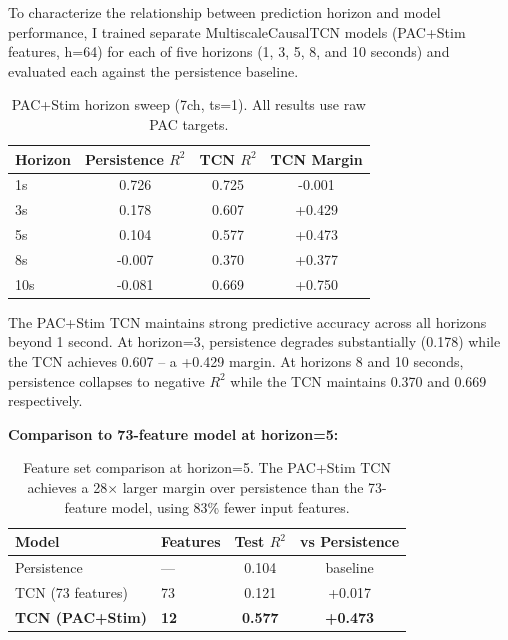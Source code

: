 \documentclass[11pt,letterpaper]{article}
\begin{document}
To characterize the relationship between prediction horizon and model performance, I trained separate MultiscaleCausalTCN models (PAC+Stim features, h=64) for each of five horizons (1, 3, 5, 8, and 10 seconds) and evaluated each against the persistence baseline.

\begin{table}[htbp]
\centering
\caption{PAC+Stim horizon sweep (7ch, ts=1). All results use raw PAC targets.}
\label{tab:horizon_sweep}
\small
\begin{tabular}{lccc}
\toprule
\textbf{Horizon} & \textbf{Persistence $R^2$} & \textbf{TCN $R^2$} & \textbf{TCN Margin} \\
\midrule
1s & 0.726 & 0.725 & -0.001 \\
3s & 0.178 & 0.607 & +0.429 \\
5s & 0.104 & 0.577 & +0.473 \\
8s & -0.007 & 0.370 & +0.377 \\
10s & -0.081 & 0.669 & +0.750 \\
\bottomrule
\end{tabular}
\end{table}

The PAC+Stim TCN maintains strong predictive accuracy across all horizons beyond 1 second. At horizon=3, persistence degrades substantially (0.178) while the TCN achieves 0.607 -- a +0.429 margin. At horizons 8 and 10 seconds, persistence collapses to negative $R^2$ while the TCN maintains 0.370 and 0.669 respectively.

\textbf{Comparison to 73-feature model at horizon=5:}

\begin{table}[htbp]
\centering
\caption{Feature set comparison at horizon=5. The PAC+Stim TCN achieves a 28$\times$ larger margin over persistence than the 73-feature model, using 83\% fewer input features.}
\label{tab:feature_comparison}
\small
\begin{tabular}{llcc}
\toprule
\textbf{Model} & \textbf{Features} & \textbf{Test $R^2$} & \textbf{vs Persistence} \\
\midrule
Persistence & --- & 0.104 & baseline \\
TCN (73 features) & 73 & 0.121 & +0.017 \\
\textbf{TCN (PAC+Stim)} & \textbf{12} & \textbf{0.577} & \textbf{+0.473} \\
\bottomrule
\end{tabular}
\end{table}
\end{document}
